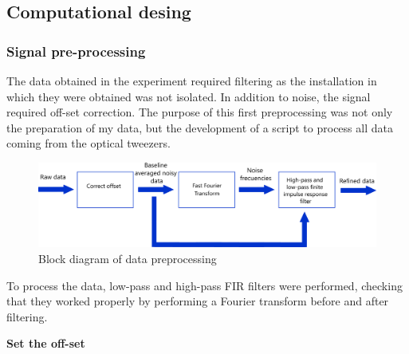 \documentclass[12pt, a4paper]{article} %
\begin{document}
	\setlength{\parindent}{8pt}
	
	\setlength{\parskip}{0mm}
	
	\subsection{Computational desing}
	
	\subsubsection{Signal pre-processing}
	
	The data obtained in the experiment required filtering as the installation in which they were obtained was not isolated. In addition to noise, the signal required off-set correction. The purpose of this first preprocessing was not only the preparation of my data, but the development of a script to process all data coming from the optical tweezers. 
	
	\setlength{\parskip}{4mm}
	
	\begin{figure}[htbp]
		\centering
		\includegraphics[width=1\textwidth]{figures/esquema_preprocesado_metodos_1.png}
		\caption{Block diagram of data preprocessing}
		\label{fig:esquema_preprocesado}
	\end{figure}
	
	To process the data, low-pass and high-pass FIR filters were performed, checking that they worked properly by performing a Fourier transform before and after filtering. 
	
	\setlength{\parskip}{8mm}
	\setlength{\parindent}{0pt}
	
	\newpage
	
	\textbf{Set the off-set}
	\setlength{\parskip}{0mm}
	
\end{document}
